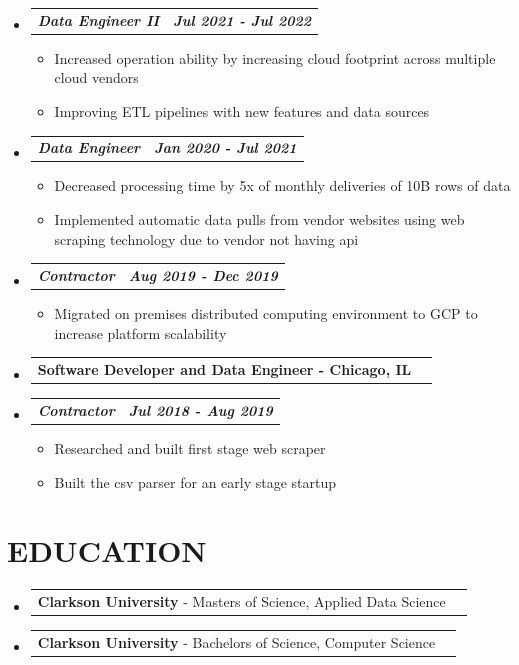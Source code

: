 \documentclass[letterpaper,11pt]{article}
\makeatletter
\newcommand{\resumeItem}[1]{
  \item\small{
    {#1 \vspace{0pt}}
  }
}
\newcommand{\resumeSubheading}[2]{
  \vspace{-1pt}\item
    \begin{tabular*}{0.97\textwidth}[t]{l@{\extracolsep{\fill}}r}
      \textbf{\small#1 - \small#2} 
    \end{tabular*}\vspace{-13pt}
}
\newcommand{\resumeSubSubheading}[2]{
    \item
    \vspace{2pt}
    \begin{tabular*}{0.97\textwidth}{l@{\extracolsep{\fill}}r}
      \textbf{\textit{\small#1}} & \textbf{\textit{\small#2}} \\
    \end{tabular*}\vspace{-5pt}
}
\newcommand{\educationSubheading}[3]{
  \vspace{-2pt}\item
    \begin{tabular*}{0.98\textwidth}[t]{l@{\extracolsep{\fill}}r}
      \textbf{\small#1} - {\small#2} & \textbf{\textit{\small#3}} \\
    \end{tabular*}\vspace{-7pt}
}
\newcommand{\resumeHeadingListStart}{\begin{itemize}[leftmargin=0.05in, label={}]}
\newcommand{\resumeHeadingListEnd}{\end{itemize}}
\newcommand{\resumeSubHeadingListStart}{\begin{itemize}[leftmargin=0.15in, label={}]}
\newcommand{\resumeSubHeadingListEnd}{\end{itemize}\vspace{-15pt}}
\newcommand{\resumeItemListStart}{\begin{itemize}[leftmargin=0.15in]}
\newcommand{\resumeItemListEnd}{\end{itemize}\vspace{-10pt}}
\makeatother
\begin{document}
        \resumeSubHeadingListStart
            \resumeSubSubheading {Data Engineer II}{Jul 2021 - Jul 2022}
            \resumeItemListStart
                \resumeItem{Increased operation ability by increasing cloud footprint across multiple cloud vendors}
                \resumeItem{Improving ETL pipelines with new features and data sources}
            \resumeItemListEnd
        \resumeSubHeadingListEnd
        \resumeSubHeadingListStart
            \resumeSubSubheading {Data Engineer}{Jan 2020 - Jul 2021}
            \resumeItemListStart
                \resumeItem{Decreased processing time by 5x of monthly deliveries of 10B rows of data}
                \resumeItem{Implemented automatic data pulls from vendor websites using web scraping technology due to vendor not having api}
            \resumeItemListEnd
        \resumeSubHeadingListEnd
        \resumeSubHeadingListStart
            \resumeSubSubheading {Contractor}{Aug 2019 - Dec 2019}
            \resumeItemListStart
                \resumeItem{    Migrated on premises distributed computing environment to GCP to increase platform scalability}
            \resumeItemListEnd
        \resumeSubHeadingListEnd
    \resumeHeadingListStart
        \resumeSubheading{Software Developer and Data Engineer}{Chicago, IL}
    \resumeHeadingListEnd
        \resumeSubHeadingListStart
            \resumeSubSubheading {Contractor}{Jul 2018 - Aug 2019}
            \resumeItemListStart
                \resumeItem{Researched and built first stage web scraper}
                \resumeItem{Built the csv parser for an early stage startup}
            \resumeItemListEnd
        \resumeSubHeadingListEnd
\section{\textbf{EDUCATION}} 
    \begin{itemize}[leftmargin=0.05in, label={}]
        \educationSubheading{Clarkson University}{Masters of Science, Applied Data Science}{}
        \educationSubheading{Clarkson University}{Bachelors of Science, Computer Science}{}
    \end{itemize}
\end{document}
